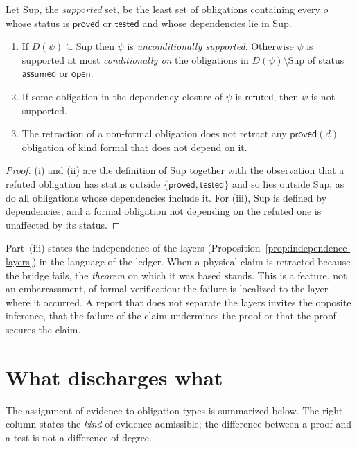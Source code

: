 Let $\mathrm{Sup}$, the \emph{supported} set, be the least set of obligations containing every $o$ whose status is $\mathsf{proved}$ or $\mathsf{tested}$ and whose dependencies lie in $\mathrm{Sup}$.

\begin{proposition}
\label{prop:supported}
\begin{enumerate}[label=(\roman*),nosep]
\item If $D(\psi)\subseteq\mathrm{Sup}$ then $\psi$ is \emph{unconditionally supported}. Otherwise $\psi$ is supported at most \emph{conditionally on} the obligations in $D(\psi)\setminus\mathrm{Sup}$ of status $\mathsf{assumed}$ or $\mathsf{open}$.
\item If some obligation in the dependency closure of $\psi$ is $\mathsf{refuted}$, then $\psi$ is not supported.
\item The retraction of a non-formal obligation does not retract any $\mathsf{proved}(d)$ obligation of kind formal that does not depend on it.
\end{enumerate}
\end{proposition}

\begin{proof}
(i) and (ii) are the definition of $\mathrm{Sup}$ together with the observation that a refuted obligation has status outside $\{\mathsf{proved},\mathsf{tested}\}$ and so lies outside $\mathrm{Sup}$, as do all obligations whose dependencies include it. For (iii), $\mathrm{Sup}$ is defined by dependencies, and a formal obligation not depending on the refuted one is unaffected by its status.
\end{proof}

Part~(iii) states the independence of the layers (Proposition~\ref{prop:independence-layers}) in the language of the ledger. When a physical claim is retracted because the bridge fails, the \emph{theorem} on which it was based stands. This is a feature, not an embarrassment, of formal verification: the failure is localized to the layer where it occurred. A report that does not separate the layers invites the opposite inference, that the failure of the claim undermines the proof or that the proof secures the claim.

\section{What discharges what}
\label{sec:discharge}

The assignment of evidence to obligation types is summarized below. The right column states the \emph{kind} of evidence admissible; the difference between a proof and a test is not a difference of degree.

